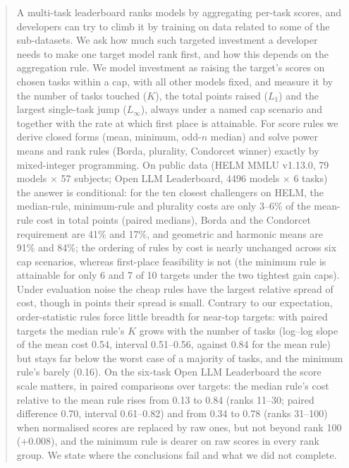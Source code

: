 \begin{abstract}
A multi-task leaderboard ranks models by aggregating per-task scores, and developers can try to climb it by training on data related to some of the sub-datasets. We ask how much such targeted investment a developer needs to make one target model rank first, and how this depends on the aggregation rule. We model investment as raising the target's scores on chosen tasks within a cap, with all other models fixed, and measure it by the number of tasks touched ($K$), the total points raised ($L_1$) and the largest single-task jump ($L_\infty$), always under a named cap scenario and together with the rate at which first place is attainable. For score rules we derive closed forms (mean, minimum, odd-$n$ median) and solve power means and rank rules (Borda, plurality, Condorcet winner) exactly by mixed-integer programming. On public data (HELM MMLU v1.13.0, 79 models $\times$ 57 subjects; Open LLM Leaderboard, 4496 models $\times$ 6 tasks) the answer is conditional: for the ten closest challengers on HELM, the median-rule, minimum-rule and plurality costs are only 3--6\% of the mean-rule cost in total points (paired medians), Borda and the Condorcet requirement are 41\% and 17\%, and geometric and harmonic means are 91\% and 84\%; the ordering of rules by cost is nearly unchanged across six cap scenarios, whereas first-place feasibility is not (the minimum rule is attainable for only 6 and 7 of 10 targets under the two tightest gain caps). Under evaluation noise the cheap rules have the largest relative spread of cost, though in points their spread is small. Contrary to our expectation, order-statistic rules force little breadth for near-top targets: with paired targets the median rule's $K$ grows with the number of tasks (log--log slope of the mean cost 0.54, interval 0.51--0.56, against 0.84 for the mean rule) but stays far below the worst case of a majority of tasks, and the minimum rule's barely (0.16). On the six-task Open LLM Leaderboard the score scale matters, in paired comparisons over targets: the median rule's cost relative to the mean rule rises from 0.13 to 0.84 (ranks 11--30; paired difference 0.70, interval 0.61--0.82) and from 0.34 to 0.78 (ranks 31--100) when normalised scores are replaced by raw ones, but not beyond rank 100 (+0.008), and the minimum rule is dearer on raw scores in every rank group. We state where the conclusions fail and what we did not complete.
\end{abstract}
